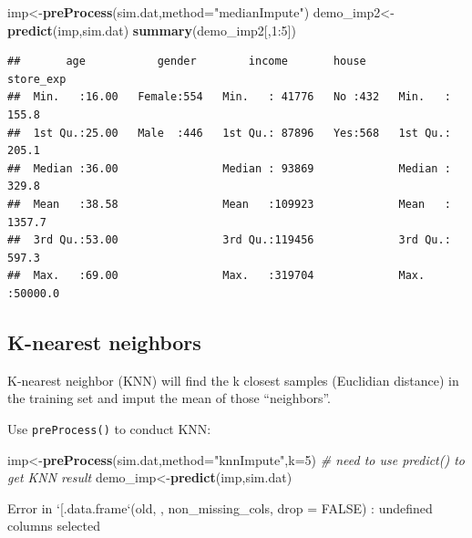 \documentclass[]{book}
\newenvironment{Shaded}{\begin{snugshade}}{\end{snugshade}}
\newcommand{\KeywordTok}[1]{\textcolor[rgb]{0.13,0.29,0.53}{\textbf{{#1}}}}
\newcommand{\DataTypeTok}[1]{\textcolor[rgb]{0.13,0.29,0.53}{{#1}}}
\newcommand{\DecValTok}[1]{\textcolor[rgb]{0.00,0.00,0.81}{{#1}}}
\newcommand{\StringTok}[1]{\textcolor[rgb]{0.31,0.60,0.02}{{#1}}}
\newcommand{\CommentTok}[1]{\textcolor[rgb]{0.56,0.35,0.01}{\textit{{#1}}}}
\newcommand{\NormalTok}[1]{{#1}}
\theoremstyle{definition}
\theoremstyle{definition}
\theoremstyle{remark}
\begin{document}
\begin{Shaded}
\begin{Highlighting}[]
\NormalTok{imp<-}\KeywordTok{preProcess}\NormalTok{(sim.dat,}\DataTypeTok{method=}\StringTok{"medianImpute"}\NormalTok{)}
\NormalTok{demo_imp2<-}\KeywordTok{predict}\NormalTok{(imp,sim.dat)}
\KeywordTok{summary}\NormalTok{(demo_imp2[,}\DecValTok{1}\NormalTok{:}\DecValTok{5}\NormalTok{])}
\end{Highlighting}
\end{Shaded}

\begin{verbatim}
##       age           gender        income       house       store_exp      
##  Min.   :16.00   Female:554   Min.   : 41776   No :432   Min.   :  155.8  
##  1st Qu.:25.00   Male  :446   1st Qu.: 87896   Yes:568   1st Qu.:  205.1  
##  Median :36.00                Median : 93869             Median :  329.8  
##  Mean   :38.58                Mean   :109923             Mean   : 1357.7  
##  3rd Qu.:53.00                3rd Qu.:119456             3rd Qu.:  597.3  
##  Max.   :69.00                Max.   :319704             Max.   :50000.0
\end{verbatim}

\subsection{K-nearest neighbors}\label{k-nearest-neighbors}

K-nearest neighbor (KNN) will find the k closest samples (Euclidian
distance) in the training set and imput the mean of those ``neighbors''.

Use \texttt{preProcess()} to conduct KNN:

\begin{Shaded}
\begin{Highlighting}[]
\NormalTok{imp<-}\KeywordTok{preProcess}\NormalTok{(sim.dat,}\DataTypeTok{method=}\StringTok{"knnImpute"}\NormalTok{,}\DataTypeTok{k=}\DecValTok{5}\NormalTok{)}
\CommentTok{# need to use predict() to get KNN result}
\NormalTok{demo_imp<-}\KeywordTok{predict}\NormalTok{(imp,sim.dat)}
\end{Highlighting}
\end{Shaded}

\begin{Shaded}
\begin{Highlighting}[]
\NormalTok{Error in `[.data.frame`(old, , non_missing_cols, drop = FALSE) : }
  \NormalTok{undefined columns selected}
\end{Highlighting}
\end{Shaded}
\end{document}
